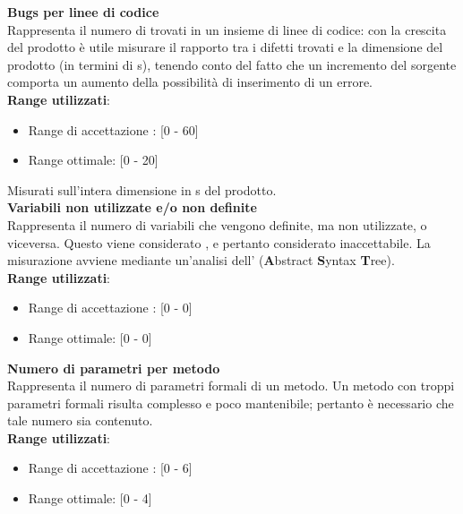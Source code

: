 \textbf{Bugs per linee di codice}\\

Rappresenta il numero di  trovati in un insieme di linee di codice: con la crescita del prodotto è utile misurare il rapporto tra i difetti trovati e la dimensione del prodotto (in termini di s), tenendo conto del fatto che un incremento del sorgente comporta un aumento della possibilità di inserimento di un errore. \\

\textbf{Range utilizzati}:

\begin{itemize}
	\item Range di accettazione : [0 - 60]
	\item Range ottimale: [0 - 20]
\end{itemize}
Misurati sull'intera dimensione in s del prodotto.\\

\textbf{Variabili non utilizzate e/o non definite}\\

Rappresenta il numero di variabili che vengono definite, ma non utilizzate, o viceversa. Questo viene considerato , e pertanto considerato inaccettabile. La misurazione avviene mediante un'analisi dell'\textbf{} (\textbf{A}bstract \textbf{S}yntax \textbf{T}ree). \\

\textbf{Range utilizzati}:
\begin{itemize}
	\item Range di accettazione : [0 - 0]
	\item Range ottimale: [0 - 0]
\end{itemize}


\textbf{Numero di parametri per metodo}\\

Rappresenta il numero di parametri formali di un metodo. Un metodo con troppi parametri formali risulta complesso e poco mantenibile; pertanto è necessario che tale numero sia contenuto. \\

\textbf{Range utilizzati}:
\begin{itemize}
	\item Range di accettazione : [0 - 6]
	\item Range ottimale: [0 - 4]
\end{itemize}

